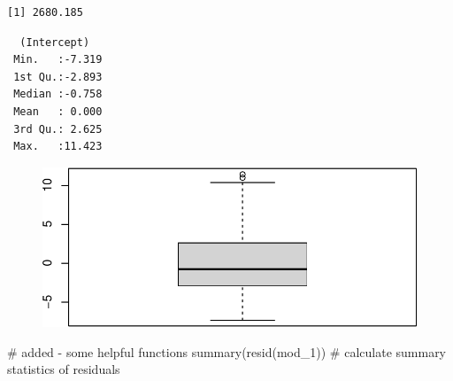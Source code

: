 \documentclass[
  letterpaper,
  DIV=11,
  numbers=noendperiod]{scrreprt}
\newenvironment{Shaded}{\begin{snugshade}}{\end{snugshade}}
\newcommand{\CommentTok}[1]{\textcolor[rgb]{0.37,0.37,0.37}{#1}}
\newcommand{\FunctionTok}[1]{\textcolor[rgb]{0.28,0.35,0.67}{#1}}
\newcommand{\NormalTok}[1]{\textcolor[rgb]{0.00,0.23,0.31}{#1}}
\newcommand{\SpecialCharTok}[1]{\textcolor[rgb]{0.37,0.37,0.37}{#1}}
\begin{document}
\begin{verbatim}
[1] 2680.185
\end{verbatim}

\begin{Shaded}
\end{Shaded}

\begin{verbatim}
  (Intercept)    
 Min.   :-7.319  
 1st Qu.:-2.893  
 Median :-0.758  
 Mean   : 0.000  
 3rd Qu.: 2.625  
 Max.   :11.423  
\end{verbatim}

\begin{Shaded}
\end{Shaded}

\begin{figure}[H]

{\centering \includegraphics{Longi_mixeffect_files/figure-pdf/unnamed-chunk-6-1.pdf}

}

\end{figure}

\begin{Shaded}
\begin{Highlighting}[]
\CommentTok{\# added {-} some helpful functions}
\FunctionTok{summary}\NormalTok{(}\FunctionTok{resid}\NormalTok{(mod\_1))  }\CommentTok{\# calculate summary statistics of residuals}
\end{Highlighting}
\end{Shaded}
\end{document}

